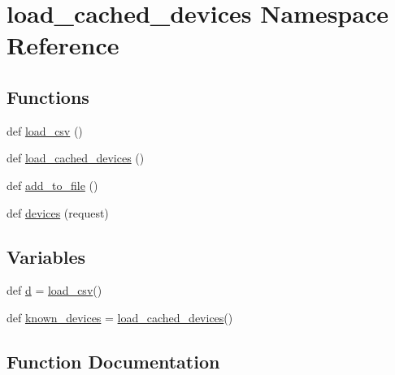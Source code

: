 \hypertarget{namespaceload__cached__devices}{}\section{load\+\_\+cached\+\_\+devices Namespace Reference}
\label{namespaceload__cached__devices}
\subsection*{Functions}
\begin{DoxyCompactItemize}
\item 
def \hyperlink{namespaceload__cached__devices_a022135c39e44cf17855316761513aec7}{load\+\_\+csv} ()
\item 
def \hyperlink{namespaceload__cached__devices_a1b27de57237c60f1affef7e0a898ca0c}{load\+\_\+cached\+\_\+devices} ()
\item 
def \hyperlink{namespaceload__cached__devices_af7403880341495ce86fce1a7ae3af525}{add\+\_\+to\+\_\+file} ()
\item 
def \hyperlink{namespaceload__cached__devices_a1b0c998e5dae25c8a19f315a7540fc35}{devices} (request)
\end{DoxyCompactItemize}
\subsection*{Variables}
\begin{DoxyCompactItemize}
\item 
def \hyperlink{namespaceload__cached__devices_acdaec1aaba119e6b4e68e9a81ef966a9}{d} = \hyperlink{namespaceload__cached__devices_a022135c39e44cf17855316761513aec7}{load\+\_\+csv}()
\item 
def \hyperlink{namespaceload__cached__devices_a7b8e627ee267b205ae0d818e015f6359}{known\+\_\+devices} = \hyperlink{namespaceload__cached__devices_a1b27de57237c60f1affef7e0a898ca0c}{load\+\_\+cached\+\_\+devices}()
\end{DoxyCompactItemize}


\subsection{Function Documentation}
\mbox{\label{namespaceload__cached__devices_af7403880341495ce86fce1a7ae3af525}} 
